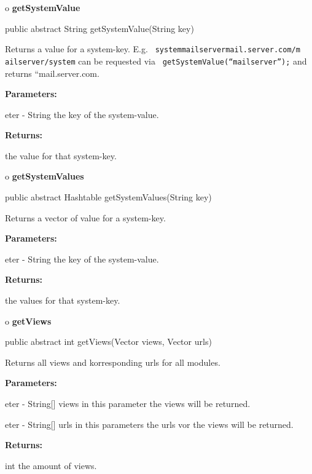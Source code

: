 o {\bf getSystemValue} 

\begin{PRE}
 public abstract String getSystemValue(String key)
\end{PRE}

\begin{description}
\htmlDD Returns a value for a system-key. E.g. {\tt
{\htmlLt}system{\htmlGt}{\htmlLt}mailserver{\htmlGt}mail.server.com{\htmlLt}/m%
ailserver{\htmlGt}{\htmlLt}/system{\htmlGt}} can be requested via {\tt
getSystemValue(``mailserver'');} and returns ``mail.server.com. 

\begin{description}
\item {\bf Parameters:}  

eter - String the key of the system-value.  
\item {\bf Returns:}  

the value for that system-key.  
\end{description}

\end{description}

o {\bf getSystemValues} 

\begin{PRE}
 public abstract Hashtable getSystemValues(String key)
\end{PRE}

\begin{description}
\htmlDD Returns a vector of value for a system-key. 

\begin{description}
\item {\bf Parameters:}  

eter - String the key of the system-value.  
\item {\bf Returns:}  

the values for that system-key.  
\end{description}

\end{description}

o {\bf getViews} 

\begin{PRE}
 public abstract int getViews(Vector views,
                              Vector urls)
\end{PRE}

\begin{description}
\htmlDD Returns all views and korresponding urls for all modules. 

\begin{description}
\item {\bf Parameters:}  

eter - String[] views in this parameter the views will be returned.  

eter - String[] urls in this parameters the urls vor the views will be
returned.  
\item {\bf Returns:}  

int the amount of views.  
\end{description}

\end{description}


